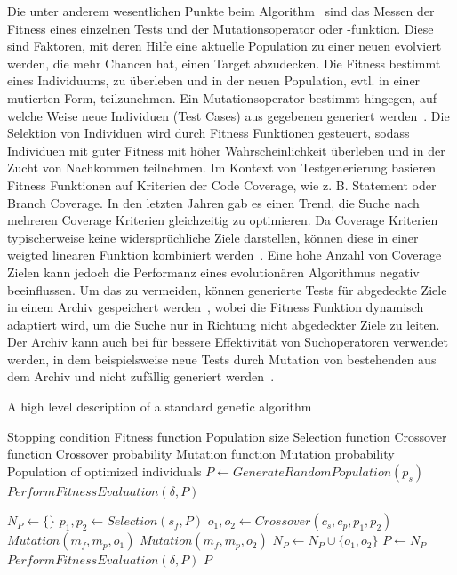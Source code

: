 \documentclass{article}
\newcommand{\Desc}[2]{\State \makebox[2em][l]{#1}#2}
\begin{document}
Die unter anderem wesentlichen Punkte beim Algorithm~ sind das Messen der Fitness eines einzelnen Tests und der Mutationsoperator oder -funktion. Diese sind Faktoren, mit deren Hilfe eine aktuelle Population zu einer neuen evolviert werden, die mehr Chancen hat, einen Target abzudecken. Die Fitness bestimmt eines Individuums, zu überleben und in der neuen Population, evtl. in einer mutierten Form, teilzunehmen. Ein Mutationsoperator bestimmt hingegen, auf welche Weise neue Individuen (Test Cases) aus gegebenen generiert werden~\cite{Tonella2004}. Die Selektion von Individuen wird durch Fitness Funktionen gesteuert, sodass Individuen mit guter Fitness mit höher Wahrscheinlichkeit überleben und in der Zucht von Nachkommen teilnehmen. Im Kontext von Testgenerierung basieren Fitness Funktionen auf Kriterien der Code Coverage, wie z. B. Statement oder Branch Coverage. In den letzten Jahren gab es einen Trend, die Suche nach mehreren Coverage Kriterien gleichzeitig zu optimieren. Da Coverage Kriterien typischerweise keine widersprüchliche Ziele darstellen, können diese in einer weigted linearen Funktion kombiniert werden~\cite{Rojas2015}. Eine hohe Anzahl von Coverage Zielen kann jedoch die Performanz eines evolutionären Algorithmus negativ beeinflussen. Um das zu vermeiden, können generierte Tests für abgedeckte Ziele in einem Archiv gespeichert werden~\cite{Rojas2017}, wobei die Fitness Funktion dynamisch adaptiert wird, um die Suche nur in Richtung nicht abgedeckter Ziele zu leiten. Der Archiv kann auch bei für bessere Effektivität von Suchoperatoren verwendet werden, in dem beispielsweise neue Tests durch Mutation von bestehenden aus dem Archiv und nicht zufällig generiert werden~\cite{Campos2017}.
\begin{algorithm}
\caption{A high level description of a standard genetic algorithm~\cite{Campos2017}}\label{alg:genetic-algorithm}
\begin{algorithmic}
\Input
  \Desc{$C$}{Stopping condition}
  \Desc{$\delta$}{Fitness function}
  \Desc{$p_s$}{Population size}
  \Desc{$s_f$}{Selection function}
  \Desc{$c_f$}{Crossover function}
  \Desc{$c_p$}{Crossover probability}
  \Desc{$m_f$}{Mutation function}
  \Desc{$m_p$}{Mutation probability}
  \EndInput
  \Output
  \Desc{$P$}{Population of optimized individuals}
  \EndOutput
\State $P \gets GenerateRandomPopulation(p_s)$
\State $PerformFitnessEvaluation(\delta, P)$

    \State $N_P \gets \{\}$
        \State $p_1, p_2 \gets Selection(s_f, P)$
        \State $o_1, o_2 \gets Crossover(c_s, c_p, p_1, p_2)$
        \State $Mutation(m_f, m_p, o_1)$
        \State $Mutation(m_f, m_p, o_2)$
        \State $N_P \gets N_P \cup \{o_1, o_2\}$
    \EndWhile
    \State $P \gets N_P$
    \State $PerformFitnessEvaluation(\delta, P)$
\EndWhile
\State \Return $P$
\end{algorithmic}
\end{algorithm}
\end{document}
